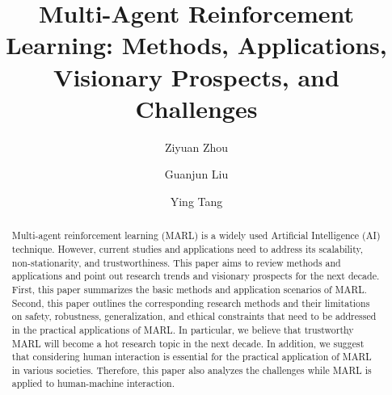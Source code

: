 \documentclass[acmsmall]{acmart}
\begin{document}
\title{Multi-Agent Reinforcement Learning: Methods, Applications, Visionary Prospects, and Challenges}

\author{Ziyuan Zhou}
\author{Guanjun Liu} 

\author{Ying Tang}


\renewcommand{\shortauthors}{Z. Zhou, G. Liu and Y. Tang}
\begin{abstract}
Multi-agent reinforcement learning (MARL) is a widely used Artificial Intelligence (AI) technique. However, current studies and applications need to address its scalability, non-stationarity, and trustworthiness. This paper aims to review methods and applications and point out research trends and visionary prospects for the next decade. 
First, this paper summarizes the basic methods and application scenarios of MARL. 
Second, this paper outlines the corresponding research methods and their limitations on safety, robustness, generalization, and ethical constraints that need to be addressed in the practical applications of MARL.
In particular, we believe that trustworthy MARL will become a hot research topic in the next decade. 
In addition, we suggest that considering human interaction is essential for the practical application of MARL in various societies.
Therefore, this paper also analyzes the challenges while MARL is applied to human-machine interaction. 
\end{abstract}
\end{document}
